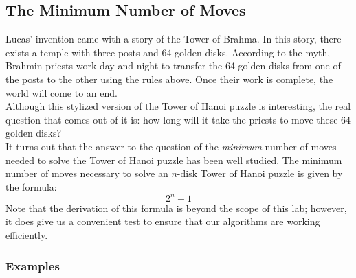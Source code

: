 		\subsection{The Minimum Number of Moves}
			Lucas' invention came with a story of the Tower of Brahma. In this story, there exists a temple with three posts and 64 golden disks. According to the myth, Brahmin priests work day and night to transfer the 64 golden disks from one of the posts to the other using the rules above. Once their work is complete, the world will come to an end.\\[\baselineskip]
			Although this stylized version of the Tower of Hanoi puzzle is interesting, the real question that comes out of it is: how long will it take the priests to move these 64 golden disks?\\[\baselineskip]
			It turns out that the answer to the question of the \emph{minimum} number of moves needed to solve the Tower of Hanoi puzzle has been well studied. The minimum number of moves necessary to solve an $n$-disk Tower of Hanoi puzzle is given by the formula:
			\[ 2^{n} - 1 \]
			Note that the derivation of this formula is beyond the scope of this lab; however, it does give us a convenient test to ensure that our algorithms are working efficiently.

			\subsubsection*{Examples}
			\ \\[9pt]

	\pagebreak

